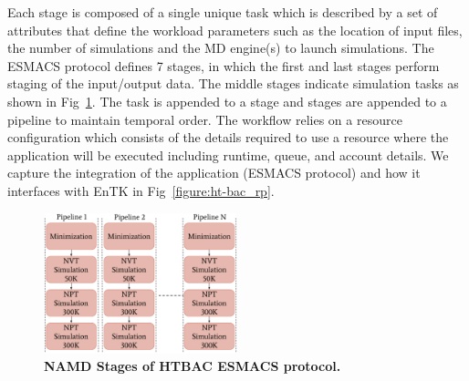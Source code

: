 

Each stage is composed of a single unique task which is described by a set of
attributes that define the workload parameters such as the location of input
files, the number of simulations and the MD engine(s) to launch simulations.
The ESMACS protocol defines 7 stages, in which the first and last
stages perform staging of the input/output data. The middle stages indicate
simulation tasks as shown in Fig~\ref{figure:ESMACS-pipelines}. The task is
appended to a stage and stages are appended to a pipeline to maintain
temporal order. The workflow relies on a resource configuration which
consists of the details required to use a resource where the application will
be executed including runtime, queue, and account details. We capture the
integration of the application (ESMACS protocol) and how it interfaces with
EnTK in Fig~\ref{figure:ht-bac_rp}.

\begin{figure}
\centering
  \includegraphics[width=0.5\textwidth]{FIGURES/HT-BAC_NAMD_pipelines_control_flow_only.pdf}
  \caption{\bf NAMD Stages of HTBAC ESMACS protocol.}
  \label{figure:ESMACS-pipelines}
\end{figure}


